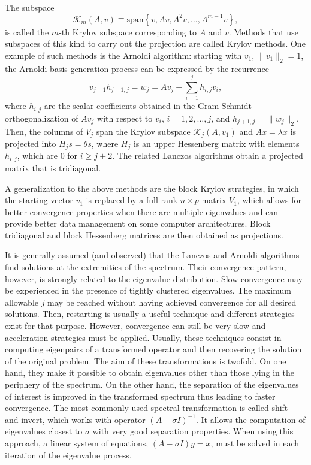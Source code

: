 	The subspace
\begin{equation}
\mathcal{K}_m(A,v)\equiv\mathrm{span}\left\{v,Av,A^2v,\ldots,A^{m-1}v\right\},\label{eq:krylov}
\end{equation}
is called the $m$-th Krylov subspace corresponding to $A$ and $v$. Methods that use subspaces of this kind to carry out the projection are called Krylov methods. One example of such methods is the Arnoldi algorithm: starting with $v_1$, $\|v_1\|_2=1$, the Arnoldi basis generation process can be expressed by the recurrence
\begin{equation}
v_{j+1}h_{j+1,j}=w_j=Av_j-\sum_{i=1}^jh_{i,j}v_i,
\end{equation}
where $h_{i,j}$ are the scalar coefficients obtained in the Gram-Schmidt orthogonalization of $Av_j$ with respect to $v_i$, $i=1,2,\ldots,j$, and $h_{j+1,j}=\|w_j\|_2$. Then, the columns of $V_j$ span the Krylov subspace $\mathcal{K}_j(A,v_1)$ and $Ax=\lambda x$ is projected into $H_js=\theta s$, where $H_j$ is an upper Hessenberg matrix with elements $h_{i,j}$, which are 0 for $i\geq j+2$. The related Lanczos algorithms obtain a projected matrix that is tridiagonal.

	A generalization to the above methods are the block Krylov strategies, in which the starting vector $v_1$ is replaced by a full rank $n\times p$ matrix $V_1$, which allows for better convergence properties when there are multiple eigenvalues and can provide better data management on some computer architectures. Block tridiagonal and block Hessenberg matrices are then obtained as projections.

	It is generally assumed (and observed) that the Lanczos and Arnoldi algorithms find solutions at the extremities of the spectrum. Their convergence pattern, however, is strongly related to the eigenvalue distribution. Slow convergence may be experienced in the presence of tightly clustered eigenvalues. The maximum allowable $j$ may be reached without having achieved convergence for all desired solutions. Then, restarting is usually a useful technique and different strategies exist for that purpose. However, convergence can still be very slow and acceleration strategies must be applied. Usually, these techniques consist in computing eigenpairs of a transformed operator and then recovering the solution of the original problem. The aim of these transformations is twofold. On one hand, they make it possible to obtain eigenvalues other than those lying in the periphery of the spectrum. On the other hand, the separation of the eigenvalues of interest is improved in the transformed spectrum thus leading to faster convergence. The most commonly used spectral transformation is called shift-and-invert, which works with operator $(A-\sigma I)^{-1}$. It allows the computation of eigenvalues closest to $\sigma$ with very good separation properties. When using this approach, a linear system of equations, $(A-\sigma I)y=x$, must be solved in each iteration of the eigenvalue process.

